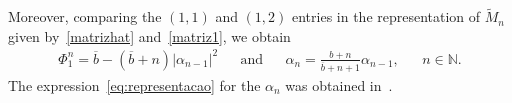\documentclass[12pt]{amsart}
\newtheorem{theorem}{Theorem}[section]
\newtheorem{corollary}{Corollary}[section]
\begin{document}
{\hspace{-.075cm}}Moreover,
comparing the \((1,1) \) and \((1,2) \) entries in the representation of \(\widetilde M_n \) given by~\eqref{matrizhat} and~\eqref{matriz1}, we obtain
\begin{align}
\label{eq:representacao}
\Phi_1^n = \overline b - (\overline b + n) |\alpha_{n-1}|^2 && \text{and} &&
\alpha_n = \frac{b+n}{\overline b + n +1} \alpha_{n-1}, && n \in \mathbb N.
\end{align}
The expression~\eqref{eq:representacao} for the \(\alpha_n \) was obtained in~\cite{Ra10}.
\end{document}
